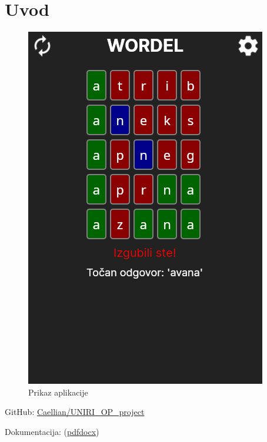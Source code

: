\documentclass[12pt,a4paper]{report}
\begin{document}
\thispagestyle{empty}




\tableofcontents
\newpage

\setcounter{page}{1}

\chapter{Uvod}

\begin{figure}
\centering
\includegraphics{../img/preview.png}
\caption{Prikaz aplikacije}
\end{figure}

{
    \raggedright

    GitHub:
    \href{https://github.com/Caellian/UNIRI_OP_project}{Caellian/UNIRI\_OP\_project}
    
    Dokumentacija:
    (\href{https://github.com/Caellian/UNIRI_OP_project/raw/main/tin_svagelj.pdf}{pdf}\textbar{}\href{https://github.com/Caellian/UNIRI_OP_project/raw/main/tin_svagelj.docx}{docx})    
}
\bigskip
\end{document}
